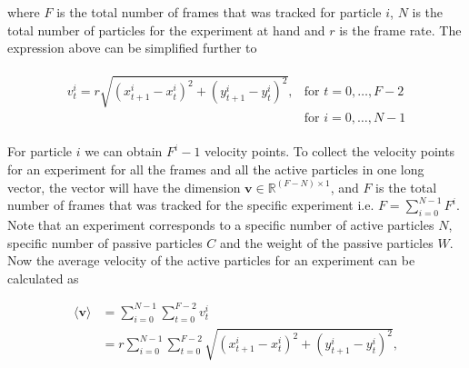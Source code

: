 where $F$ is the total number of frames that was tracked for particle $i$, $N$ is the total number of 
particles for the experiment at hand and $r$ is the frame rate. 
The expression above can be simplified further to

\begin{align}
    \begin{array}{lr}
        v_t^i = r\sqrt{\left(x_{t+1}^i-x_t^i\right)^2+\left(y_{t+1}^i-y_t^i\right)^2}, 
        & \text{for } t=0,\ldots,F-2\\
        & \text{for } i=0,\ldots,N-1
    \end{array}
    \label{eq:velocity_1par2}
\end{align}

For particle $i$ we can obtain $F^i-1$ velocity points. To collect the velocity points 
for an experiment for all the frames and all the active particles in one long vector, the
vector will have the dimension $\bm{v}\in\mathbb{R}^{(F-N)\times1}$, and $F$ is the total 
number of frames that was tracked for the specific experiment i.e. $F=\sum_{i=0}^{N-1}F^i$. 
Note that an experiment corresponds to a specific number of active particles $N$, 
specific number of passive particles $C$ and the weight of the passive particles $W$.
Now  the average velocity of the active particles for an experiment can be calculated as

\begin{align}
        \langle\bm{v}\rangle    &=   \sum_{i=0}^{N-1}\sum_{t=0}^{F-2}v_t^i \\
                                &=   r\sum_{i=0}^{N-1}\sum_{t=0}^{F-2}\sqrt{\left(x_{t+1}^i-x_t^i\right)^2+\left(y_{t+1}^i-y_t^i\right)^2}, 
    \label{eq:velocity_average}
\end{align}